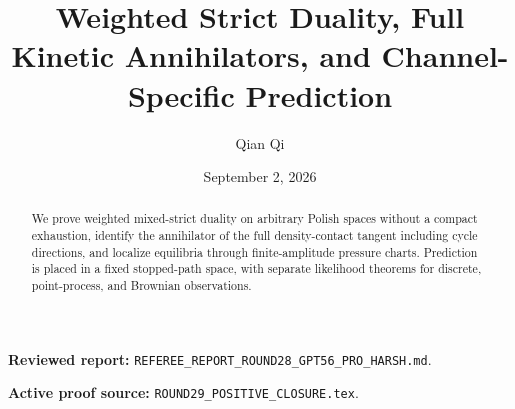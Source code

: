 \documentclass[11pt,reqno]{amsart}
\title[C2 Round 29 revision]{Weighted Strict Duality, Full Kinetic Annihilators, and Channel-Specific Prediction}
\author{Qian Qi}
\date{September 2, 2026}
\begin{document}
\begin{abstract}We prove weighted mixed-strict duality on arbitrary Polish spaces without a compact exhaustion, identify the annihilator of the full density-contact tangent including cycle directions, and localize equilibria through finite-amplitude pressure charts. Prediction is placed in a fixed stopped-path space, with separate likelihood theorems for discrete, point-process, and Brownian observations.\end{abstract}
\maketitle
\noindent\textbf{Reviewed report:} \texttt{REFEREE\_REPORT\_ROUND28\_GPT56\_PRO\_HARSH.md}.\par
\noindent\textbf{Active proof source:} \texttt{ROUND29\_POSITIVE\_CLOSURE.tex}.\par

\end{document}
